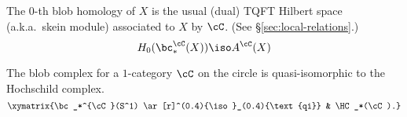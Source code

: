 \begin{property}
\label{property:skein-modules}%
The $0$-th blob homology of $X$ is the usual 
(dual) TQFT Hilbert space (a.k.a.\ skein module) associated to $X$
by $\cC$. (See \S \ref{sec:local-relations}.)
\begin{equation*}
H_0(\bc_*^{\cC}(X)) \iso A^{\cC}(X)
\end{equation*}
\end{property}

\begin{property}[Hochschild homology when $X=S^1$]
\label{property:hochschild}%
The blob complex for a $1$-category $\cC$ on the circle is
quasi-isomorphic to the Hochschild complex.
\begin{equation*}
\xymatrix{\bc_*^{\cC}(S^1) \ar[r]^(0.4){\iso}_(0.4){\text{qi}} & \HC_*(\cC).}
\end{equation*}
\end{property}

